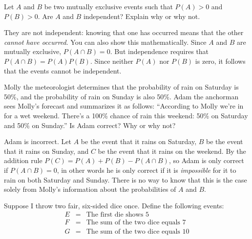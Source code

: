 \documentclass[addpoints,12pt]{exam}
\begin{document}
\begin{questions}
\question Let $A$ and $B$ be two mutually exclusive events such that $P(A)>0$ and $P(B)>0$. Are $A$ and $B$ independent? Explain why or why not.
\begin{solution} 
  They are not independent: knowing that one has occurred means that the other \emph{cannot have occurred}.
  You can also show this mathematically.
  Since $A$ and $B$ are mutually exclusive, $P(A\cap B) = 0$.
  But independence requires that $P(A\cap B) = P(A)P(B)$.
  Since neither $P(A)$ nor $P(B)$ is zero, it follows that the events cannot be independent.
\end{solution}

\question Molly the meteorologist determines that the probability of rain on Saturday is 50\%, and the probability of rain on Sunday is also 50\%.
Adam the anchorman sees Molly's forecast and summarizes it as follows:  ``According to Molly we're in for a wet weekend. There's a 100\% chance of rain this weekend: 50\% on Saturday and 50\% on Sunday.'' Is Adam correct? Why or why not? 
			\begin{solution}
				Adam is incorrect. 
        Let $A$ be the event that it rains on Saturday, $B$ be the event that it rains on Sunday, and $C$ be the event that it rains on the weekend.
        By the addition rule $P(C) = P(A) + P(B) - P(A\cap B)$, so Adam is only correct if $P(A\cap B) = 0$, in other words he is only correct if it is \emph{impossible} for it to rain on both Saturday and Sunday. There is no way to know that this is the case solely from Molly's information about the probabilities of $A$ and $B$.
			\end{solution}


\question Suppose I throw two fair, six-sided dice once. Define the following events:
	\begin{eqnarray*}
		E &=& \mbox{The first die shows 5}\\
		F &=& \mbox{The sum of the two dice equals 7}\\
		G &=& \mbox{The sum of the two dice equals 10}
	\end{eqnarray*}
\end{questions}
\end{document}
